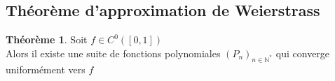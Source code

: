 \documentclass[10pt,a4paper]{article}
\theoremstyle{definition}
\newtheorem{theorem}[proposition]{Théorème}
\begin{document}
\subsection{Théorème d'approximation de Weierstrass}
\begin{theorem}
Soit $f \in C^0([0, 1])$ \\
Alors il existe une suite de fonctions polynomiales $(P_n)_{n \in \mathbb{N}^*}$ qui converge uniformément vers $f$
\end{theorem}
\end{document}
